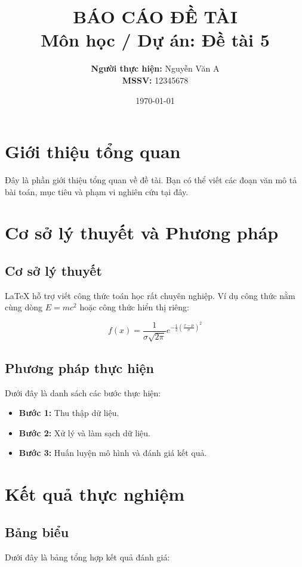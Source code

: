 \documentclass[12pt, a4paper]{article}
\title{\textbf{BÁO CÁO ĐỀ TÀI}\\ \Large Môn học / Dự án: Đề tài 5}
\author{\textbf{Người thực hiện:} Nguyễn Văn A \\ \textbf{MSSV:} 12345678}
\date{\today}
\begin{document}
\maketitle
\thispagestyle{empty}
\newpage

\tableofcontents
\newpage

\section{Giới thiệu tổng quan}
Đây là phần giới thiệu tổng quan về đề tài. Bạn có thể viết các đoạn văn mô tả bài toán, mục tiêu và phạm vi nghiên cứu tại đây.

\section{Cơ sở lý thuyết và Phương pháp}
\subsection{Cơ sở lý thuyết}
LaTeX hỗ trợ viết công thức toán học rất chuyên nghiệp. Ví dụ công thức nằm cùng dòng $E = mc^2$ hoặc công thức hiển thị riêng:

\begin{equation}
f(x) = \frac{1}{\sigma \sqrt{2\pi}} e^{-\frac{1}{2}\left(\frac{x-\mu}{\sigma}\right)^2}
\end{equation}

\subsection{Phương pháp thực hiện}
Dưới đây là danh sách các bước thực hiện:
\begin{itemize}
    \item \textbf{Bước 1:} Thu thập dữ liệu.
    \item \textbf{Bước 2:} Xử lý và làm sạch dữ liệu.
    \item \textbf{Bước 3:} Huấn luyện mô hình và đánh giá kết quả.
\end{itemize}

\section{Kết quả thực nghiệm}
\subsection{Bảng biểu}
Dưới đây là bảng tổng hợp kết quả đánh giá:
\end{document}
